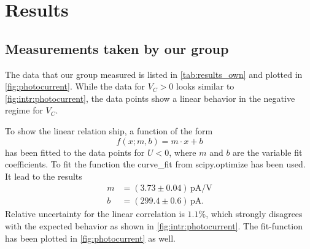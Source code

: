 \section{Results}
\label{sec:results}

\subsection{Measurements taken by our group}
The data that our group measured is listed in \autoref{tab:results_own} and plotted in
\autoref{fig:photocurrent}. While the data for $V_C>0$ looks similar to
\autoref{fig:intr:photocurrent}, the data points show
a linear behavior in the negative regime for $V_C$.

To show the linear relation ship, a function of the form
\[
  f(x; m, b) = m\cdot x + b
\]
has been fitted to the data points for $U<0$, where $m$ and $b$ are the variable fit coefficients.
To fit the function the curve\_fit from scipy.optimize has been used. It lead to the results
\begin{align}
  m &= (3.73 \pm 0.04) \, \si{\pico\ampere / \volt} \\
  b &= (299.4 \pm 0.6) \, \si{\pico\ampere}.
\end{align}
Relative uncertainty for the linear correlation is $1.1\%$, which strongly disagrees with the
expected behavior as shown in \autoref{fig:intr:photocurrent}. The fit-function has been plotted in
\autoref{fig:photocurrent} as well.

